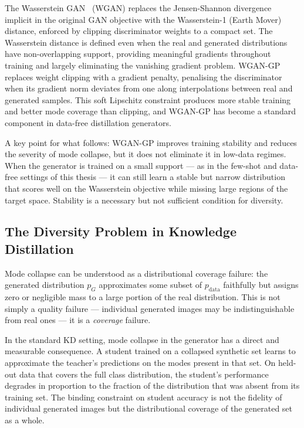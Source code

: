 \begin{foldable}
  The Wasserstein GAN~\cite{arjovsky2017wasserstein} (WGAN) replaces the Jensen-Shannon divergence implicit in the original GAN objective with the Wasserstein-1 (Earth Mover) distance, enforced by clipping discriminator weights to a compact set.
  The Wasserstein distance is defined even when the real and generated distributions have non-overlapping support, providing meaningful gradients throughout training and largely eliminating the vanishing gradient problem.
  WGAN-GP~\cite{gulrajani2017improved} replaces weight clipping with a gradient penalty, penalising the discriminator when its gradient norm deviates from one along interpolations between real and generated samples.
  This soft Lipschitz constraint produces more stable training and better mode coverage than clipping, and WGAN-GP has become a standard component in data-free distillation generators.
\end{foldable}

\begin{foldable}
  A key point for what follows: WGAN-GP improves training stability and reduces the severity of mode collapse, but it does not eliminate it in low-data regimes.
  When the generator is trained on a small support --- as in the few-shot and data-free settings of this thesis --- it can still learn a stable but narrow distribution that scores well on the
  Wasserstein objective while missing large regions of the target space.
  Stability is a necessary but not sufficient condition for diversity.
\end{foldable}

\subsection{The Diversity Problem in Knowledge Distillation}
\label{sec:25-background-synthetic-problem}

\begin{foldable}
  Mode collapse can be understood as a distributional coverage failure: the generated distribution $p_G$ approximates some subset of $p_{\text{data}}$ faithfully but assigns zero or negligible mass to a large portion of the real distribution.
  This is not simply a quality failure --- individual generated images may be indistinguishable from real ones --- it is a \emph{coverage} failure.
\end{foldable}

\begin{foldable}
  In the standard KD setting, mode collapse in the generator has a direct and measurable consequence.
  A student trained on a collapsed synthetic set learns to approximate the teacher's predictions on the modes present in that set.
  On held-out data that covers the full class distribution, the student's performance degrades in proportion to the fraction of the distribution that was absent from its training set.
  The binding constraint on student accuracy is not the fidelity of individual generated images but the distributional coverage of the generated set as a whole.
\end{foldable}

